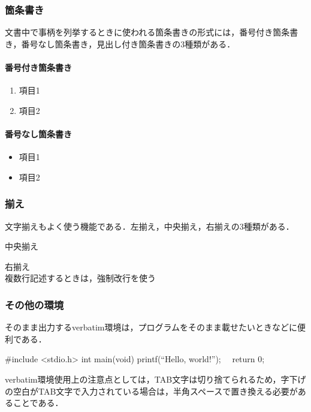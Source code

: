 \documentclass[titlepage]{jarticle}
\begin{document}
\subsubsection{箇条書き}
文書中で事柄を列挙するときに使われる箇条書きの形式には，番号付き箇条書き，番号なし箇条書き，見出し付き箇条書きの3種類がある．

\newpage

\paragraph{番号付き箇条書き}
\begin{enumerate}
\item 項目1
\item 項目2
\end{enumerate}

\paragraph{番号なし箇条書き}
\begin{itemize}
\item 項目1
\item 項目2
\end{itemize}

\subsubsection{揃え}
文字揃えもよく使う機能である．左揃え，中央揃え，右揃えの3種類がある．
\begin{center}
\item 中央揃え
\end{center}
\begin{flushright}
\item 右揃え\\
複数行記述するときは，強制改行を使う
\end{flushright}

\subsubsection{その他の環境}
そのまま出力するverbatim環境は，プログラムをそのまま載せたいときなどに便利である．
\begin{verbatim*}
#include <stdio.h>
int main(void){
  printf(``Hello, world!\n'');
　return 0;
}
\end{verbatim*}
verbatim環境使用上の注意点としては，TAB文字は切り捨てられるため，字下げの空白がTAB文字で入力されている場合は，半角スペースで置き換える必要があることである．
\end{document}
